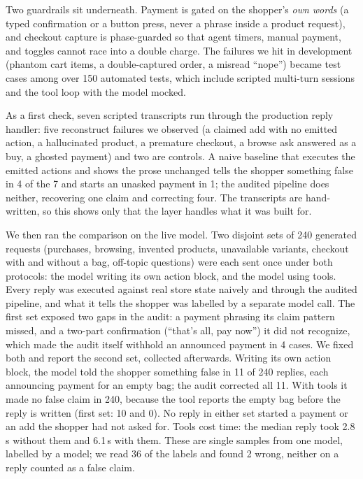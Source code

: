 \documentclass[sigconf, screen, review]{acmart}
\begin{document}
Two guardrails sit underneath. Payment is gated on the shopper's \emph{own words} (a typed confirmation or a button press, never a phrase inside a product request), and checkout capture is phase-guarded so that agent timers, manual payment, and toggles cannot race into a double charge. The failures we hit in development (phantom cart items, a double-captured order, a misread ``nope'') became test cases among over 150 automated tests, which include scripted multi-turn sessions and the tool loop with the model mocked.

As a first check, seven scripted transcripts run through the production reply handler: five reconstruct failures we observed (a claimed add with no emitted action, a hallucinated product, a premature checkout, a browse ask answered as a buy, a ghosted payment) and two are controls. A naive baseline that executes the emitted actions and shows the prose unchanged tells the shopper something false in 4 of the 7 and starts an unasked payment in 1; the audited pipeline does neither, recovering one claim and correcting four. The transcripts are hand-written, so this shows only that the layer handles what it was built for.

We then ran the comparison on the live model. Two disjoint sets of 240 generated requests (purchases, browsing, invented products, unavailable variants, checkout with and without a bag, off-topic questions) were each sent once under both protocols: the model writing its own action block, and the model using tools. Every reply was executed against real store state naively and through the audited pipeline, and what it tells the shopper was labelled by a separate model call. The first set exposed two gaps in the audit: a payment phrasing its claim pattern missed, and a two-part confirmation (``that's all, pay now'') it did not recognize, which made the audit itself withhold an announced payment in 4 cases. We fixed both and report the second set, collected afterwards. Writing its own action block, the model told the shopper something false in 11 of 240 replies, each announcing payment for an empty bag; the audit corrected all 11. With tools it made no false claim in 240, because the tool reports the empty bag before the reply is written (first set: 10 and 0). No reply in either set started a payment or an add the shopper had not asked for. Tools cost time: the median reply took 2.8\,s without them and 6.1\,s with them. These are single samples from one model, labelled by a model; we read 36 of the labels and found 2 wrong, neither on a reply counted as a false claim.
\end{document}
